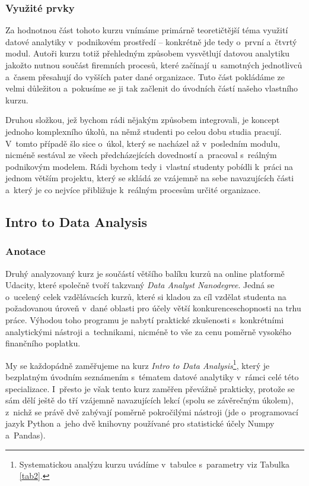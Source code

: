 \hypertarget{vyuux17eituxe9-prvky}{%
\subsubsection{Využité prvky}\label{vyuux17eituxe9-prvky}}

Za hodnotnou část tohoto kurzu vnímáme primárně teoretičtější téma využití datové analytiky v~podnikovém prostředí -- konkrétně jde tedy o~první a~čtvrtý modul. Autoři kurzu totiž přehledným způsobem vysvětlují datovou analytiku jakožto nutnou součást firemních procesů, které začínají u~samotných jednotlivců a~časem přesahují do vyšších pater dané organizace. Tuto část pokládáme ze velmi důležitou a~pokusíme se ji tak začlenit do úvodních částí našeho vlastního kurzu.

Druhou složkou, jež bychom rádi nějakým způsobem integrovali, je koncept jednoho komplexního úkolů, na němž studenti po celou dobu studia pracují. V~tomto případě šlo sice o~úkol, který se nacházel až v~posledním modulu, nicméně sestával ze všech předcházejících dovedností a~pracoval s~reálným podnikovým modelem. Rádi bychom tedy i~vlastní studenty pobídli k~práci na jednom větším projektu, který se skládá ze vzájemně na sebe navazujících části a~který je co nejvíce přibližuje k~reálným procesům určité organizace.

\hypertarget{intro-to-data-analysis}{%
\subsection{Intro to Data Analysis}\label{intro-to-data-analysis}}

\hypertarget{anotace-1}{%
\subsubsection{Anotace}\label{anotace-1}}

Druhý analyzovaný kurz je součástí většího balíku kurzů na online platformě Udacity, které společně tvoří takzvaný \emph{Data Analyst Nanodegree}. Jedná se o~ucelený celek vzdělávacích kurzů, které si kladou za cíl vzdělat studenta na požadovanou úroveň v~dané oblasti pro účely větší konkurenceschopnosti na trhu práce. Výhodou toho programu je nabytí praktické zkušenosti s~konkrétními analytickými nástroji a~technikami, nicméně to vše za cenu poměrně vysokého finančního poplatku.

My se každopádně zaměřujeme na kurz \emph{Intro to Data Analysis}\footnote{Systematickou analýzu kurzu uvádíme v~tabulce s~parametry viz Tabulka \ref{tab2}.}, který je bezplatným úvodním seznámením s~tématem datové analytiky v~rámci celé této specializace. I~přesto je však tento kurz zaměřen převážně prakticky, protože se sám dělí ještě do tří vzájemně navazujících lekcí (spolu se závěrečným úkolem), z~nichž se právě dvě zabývají poměrně pokročilými nástroji (jde o~programovací jazyk Python a~jeho dvě knihovny používané pro statistické účely Numpy a~Pandas).

